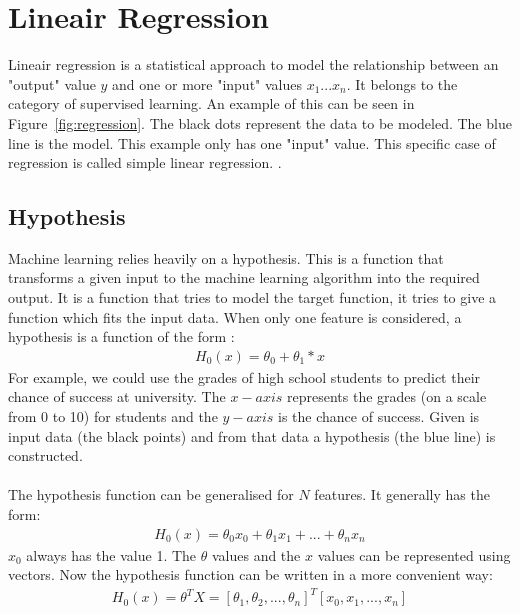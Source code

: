 \section{Lineair Regression}
\label{regression}
Lineair regression is a statistical approach to model the relationship between an "output" value $y$ and one or more "input" values $x_1...x_n$. It belongs to the category of supervised learning. An example of this can be seen in Figure~\ref{fig:regression}. The black dots represent the data to be modeled. The blue line is the model. This example only has one "input" value. This specific case of regression is called simple linear regression. \cite{scikit-regression}. 

\subsection{Hypothesis}
Machine learning relies heavily on a hypothesis. This is a function that transforms a given input to the machine learning algorithm into the required output. It is a function that tries to model the target function, it tries to give a function which fits the input data.  When only one feature is considered, a hypothesis is a function of the form \cite{stanford}: 
\begin{align}
H_0(x) = \theta_0 + \theta_1 * x 
\end{align}
For example, we could use the grades of high school students to predict their chance of success at university. The $x-axis$ represents the grades (on a scale from 0 to 10) for students and the $y-axis$ is the chance of success. Given is input data (the black points) and from that data a hypothesis (the blue line) is constructed. \\\\
The hypothesis function can be generalised for $N$ features. It generally has the form:
\begin{align}
H_0(x) = \theta_0x_0 + \theta_1x_1 + ... + \theta_nx_n
\end{align}
$x_0$ always has the value 1. The $\theta$ values and the $x$ values can be represented using vectors. Now the hypothesis function can be written in a more convenient way:
\begin{align}
\label{hypothesisfunc}
H_0(x) = \theta^TX = [\theta_1, \theta_2, ..., \theta_n]^T [x_0, x_1, ..., x_n]
\end{align}

